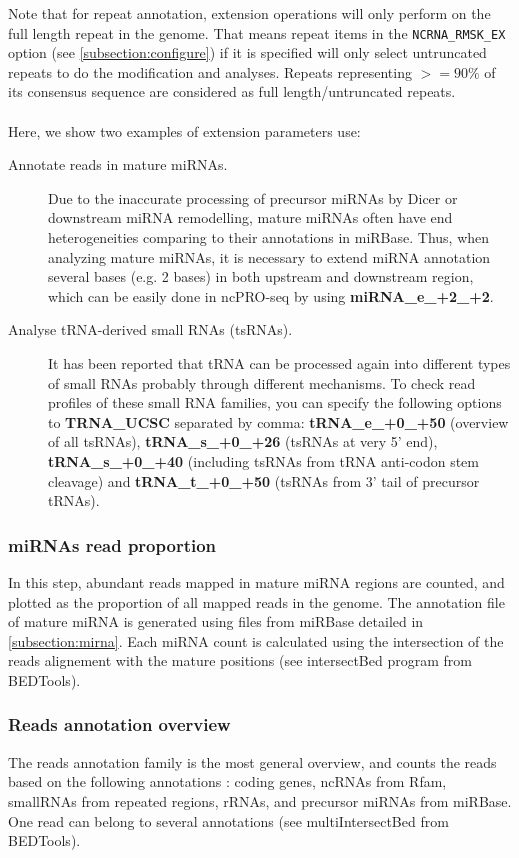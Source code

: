 \documentclass[12pt]{article}
\def \ncpip{ncPRO-seq}
\begin{document}
Note that for repeat annotation, extension operations will only perform on the full length repeat in the genome. That means repeat items in the \verb+NCRNA_RMSK_EX+ option (see \ref{subsection:configure}) if it is specified will only select untruncated repeats to do the modification and analyses. Repeats representing $>=90\%$ of its consensus sequence are considered as full length/untruncated repeats.\\\\
Here, we show two examples of extension parameters use:
\begin{description}
 \item[Annotate reads in mature miRNAs.] Due to the inaccurate processing of precursor miRNAs by Dicer or downstream miRNA remodelling, mature miRNAs often have end heterogeneities comparing to their annotations in miRBase. Thus, when analyzing mature miRNAs, it is necessary to extend miRNA annotation several bases (e.g. 2 bases) in both upstream and downstream region, which can be easily done in \ncpip{} by using \textbf{miRNA\_e\_+2\_+2}.
 \item[Analyse tRNA-derived small RNAs (tsRNAs).] It has been reported that tRNA can be processed again into different types of small RNAs probably through different mechanisms. To check read profiles of these small RNA families, you can specify the following options to \textbf{TRNA\_UCSC} separated by comma: \textbf{tRNA\_e\_+0\_+50} (overview of all tsRNAs), \textbf{tRNA\_s\_+0\_+26} (tsRNAs at very 5' end), \textbf{tRNA\_s\_+0\_+40} (including tsRNAs from tRNA anti-codon stem cleavage) and \textbf{tRNA\_t\_+0\_+50} (tsRNAs from 3' tail of precursor tRNAs).
 \end{description}

\subsubsection{miRNAs read proportion}
\label{subsubsection:mirnaread}
In this step, abundant reads mapped in mature miRNA regions are counted, and plotted as the proportion of all mapped reads in the genome. The annotation file of mature miRNA is generated using files from miRBase \cite{Kozomara2011} detailed in \ref{subsection:mirna}. Each miRNA count is calculated using the intersection of the reads alignement with the mature positions (see intersectBed program from BEDTools).

\subsubsection{Reads annotation overview}
The reads annotation family is the most general overview, and counts the reads based on the following annotations : coding genes, ncRNAs from Rfam, smallRNAs from repeated regions, rRNAs, and precursor miRNAs from miRBase. One read can belong to several annotations (see multiIntersectBed from BEDTools).
\end{document}
